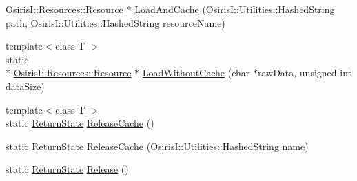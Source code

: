 \begin{DoxyCompactItemize}
\hyperlink{class_osiris_i_1_1_resources_1_1_resource}{Osiris\-I\-::\-Resources\-::\-Resource} $\ast$ \hyperlink{class_osiris_i_1_1_manager_1_1_resource_manager_a2ab390a2589ad5d99c0640d912c80fd8}{Load\-And\-Cache} (\hyperlink{class_osiris_i_1_1_utilities_1_1_hashed_string}{Osiris\-I\-::\-Utilities\-::\-Hashed\-String} path, \hyperlink{class_osiris_i_1_1_utilities_1_1_hashed_string}{Osiris\-I\-::\-Utilities\-::\-Hashed\-String} resource\-Name)
\item 
{\footnotesize template$<$class T $>$ }\\static \\*
\hyperlink{class_osiris_i_1_1_resources_1_1_resource}{Osiris\-I\-::\-Resources\-::\-Resource} $\ast$ \hyperlink{class_osiris_i_1_1_manager_1_1_resource_manager_a734a7145363244e672a116ff6363ae0f}{Load\-Without\-Cache} (char $\ast$raw\-Data, unsigned int data\-Size)
\item 
{\footnotesize template$<$class T $>$ }\\static \hyperlink{namespace_osiris_i_a8f53bf938dc75c65c6a529694514013e}{Return\-State} \hyperlink{class_osiris_i_1_1_manager_1_1_resource_manager_a10c68fc92920b7b807543ebc3f982c80}{Release\-Cache} ()
\item 
static \hyperlink{namespace_osiris_i_a8f53bf938dc75c65c6a529694514013e}{Return\-State} \hyperlink{class_osiris_i_1_1_manager_1_1_resource_manager_a3a9a4d47fea03b3d549b28ea6a6063bb}{Release\-Cache} (\hyperlink{class_osiris_i_1_1_utilities_1_1_hashed_string}{Osiris\-I\-::\-Utilities\-::\-Hashed\-String} name)
\item 
static \hyperlink{namespace_osiris_i_a8f53bf938dc75c65c6a529694514013e}{Return\-State} \hyperlink{class_osiris_i_1_1_manager_1_1_resource_manager_a560e8e0b02e30fbfb4cd1e9def4ecc2f}{Release} ()
\end{DoxyCompactItemize}
